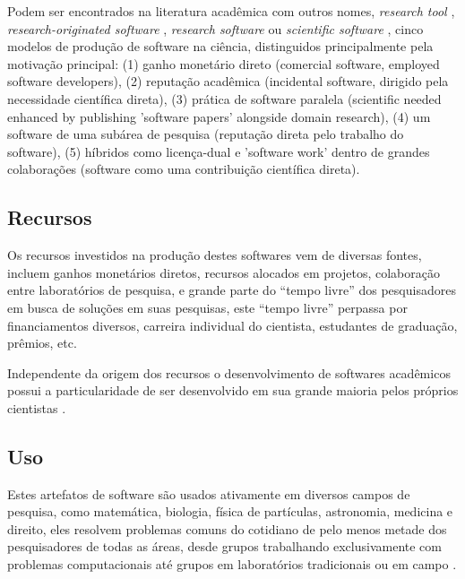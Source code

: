 Podem ser encontrados na literatura acadêmica com outros nomes,
{\it research tool} \cite{Portillo12},
{\it research-originated software} \cite{Kon2011},
{\it research software} \cite{hettrick_2014_14809} ou
{\it scientific software} \cite{segal2008developing},
cinco modelos de produção de software na ciência, distinguidos principalmente
pela motivação principal: (1) ganho monetário direto (comercial software,
employed software developers), (2) reputação acadêmica (incidental software,
dirigido pela necessidade científica direta), (3) prática de software paralela
(scientific needed enhanced by publishing 'software papers' alongside domain research),
(4) um software de uma subárea de pesquisa (reputação direta pelo trabalho do software),
(5) híbridos como licença-dual e 'software work' dentro de grandes colaborações
(software como uma contribuição científica direta).

\subsection{Recursos}

Os recursos investidos na produção destes softwares vem de diversas fontes,
incluem ganhos monetários diretos, recursos alocados em projetos, colaboração
entre laboratórios de pesquisa, e grande parte do ``tempo livre'' dos
pesquisadores em busca de soluções em suas pesquisas, este ``tempo livre''
perpassa por financiamentos diversos, carreira individual do cientista,
estudantes de graduação, prêmios, etc.

Independente da origem dos recursos o desenvolvimento de softwares acadêmicos
possui a particularidade de ser desenvolvido em sua grande maioria pelos
próprios cientistas \cite{segal2008developing, hettrick_2014_14809,
momcheva2015software}.

\subsection{Uso}


Estes artefatos de software são usados ativamente em diversos campos de pesquisa, como
matemática, biologia, física de partículas, astronomia, medicina e direito,
eles resolvem problemas comuns do cotidiano de pelo menos metade dos
pesquisadores de todas as áreas, desde grupos trabalhando exclusivamente com
problemas computacionais até grupos em laboratórios tradicionais ou em campo
\cite{wilson2014best}.

